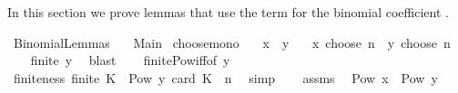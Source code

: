 %
\begin{isabellebody}%
%
%
\isadelimdocument
%
\endisadelimdocument
%
\isatagdocument
%
\isamarkuptrue%
%
\endisatagdocument
{\isafolddocument}%
%
\isadelimdocument
%
\endisadelimdocument
%
\begin{isamarkuptext}%
In this section we prove lemmas that use the term for the binomial coefficient .%
\end{isamarkuptext}\isamarkuptrue%
%
\isadelimtheory
%
\endisadelimtheory
%
\isatagtheory
{}\isamarkupfalse%
\ Binomial{\isacharunderscore}{\kern0pt}Lemmas\isanewline
\ \ \ Main\isanewline
{}%
\endisatagtheory
{\isafoldtheory}%
%
\isadelimtheory
%
\endisadelimtheory
\isanewline
\isanewline
{}\isamarkupfalse%
\ choose{\isacharunderscore}{\kern0pt}mono{\isacharcolon}{\kern0pt}\isanewline
\ \ \ {\isachardoublequoteopen}x\ {\isasymle}\ y{\isachardoublequoteclose}\isanewline
\ \ \ {\isachardoublequoteopen}x\ choose\ n\ {\isasymle}\ y\ choose\ n{\isachardoublequoteclose}\isanewline
%
\isadelimproof
%
\endisadelimproof
%
\isatagproof
{}\isamarkupfalse%
\ {\isacharminus}{\kern0pt}\isanewline
\ \ \isamarkupfalse%
\ {\isachardoublequoteopen}finite\ {\isacharbraceleft}{\kern0pt}{}{\isachardot}{\kern0pt}{\isachardot}{\kern0pt}{\isacharless}{\kern0pt}y{\isacharbraceright}{\kern0pt}{\isachardoublequoteclose}\ \isamarkupfalse%
\ blast\isanewline
\ \ \isamarkupfalse%
\ finite{\isacharunderscore}{\kern0pt}Pow{\isacharunderscore}{\kern0pt}iff{\isacharbrackleft}{\kern0pt}of\ {\isachardoublequoteopen}{\isacharbraceleft}{\kern0pt}{}{\isachardot}{\kern0pt}{\isachardot}{\kern0pt}{\isacharless}{\kern0pt}y{\isacharbraceright}{\kern0pt}{\isachardoublequoteclose}{\isacharbrackright}{\kern0pt}\ \isamarkupfalse%
\ finiteness{\isacharcolon}{\kern0pt}\ {\isachardoublequoteopen}finite\ {\isacharbraceleft}{\kern0pt}K\ {\isasymin}\ Pow\ {\isacharbraceleft}{\kern0pt}{}{\isachardot}{\kern0pt}{\isachardot}{\kern0pt}{\isacharless}{\kern0pt}y{\isacharbraceright}{\kern0pt}{\isachardot}{\kern0pt}\ card\ K\ {\isacharequal}{\kern0pt}\ n{\isacharbraceright}{\kern0pt}{\isachardoublequoteclose}\ \isamarkupfalse%
\ simp\isanewline
\ \ \isamarkupfalse%
\ assms\ \isamarkupfalse%
\ {\isachardoublequoteopen}Pow\ {\isacharbraceleft}{\kern0pt}{}{\isachardot}{\kern0pt}{\isachardot}{\kern0pt}{\isacharless}{\kern0pt}x{\isacharbraceright}{\kern0pt}\ {\isasymsubseteq}\ Pow\ {\isacharbraceleft}{\kern0pt}{}{\isachardot}{\kern0pt}{\isachardot}{\kern0pt}{\isacharless}{\kern0pt}y{\isacharbraceright}{\kern0pt}{\isachardoublequoteclose}\ \isamarkupfalse%

\end{isabellebody}
